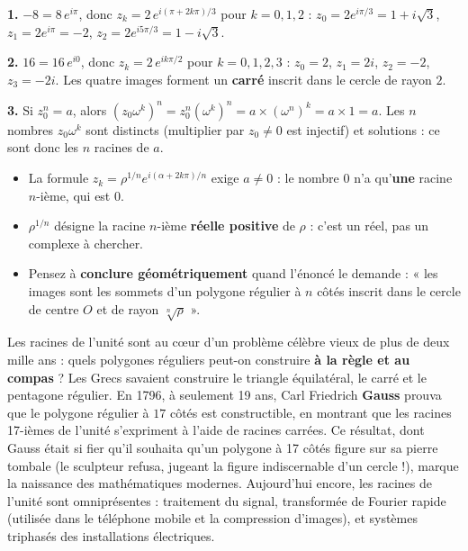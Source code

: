 \documentclass[11pt]{article}
\begin{document}
\begin{corrige}[Exercice]
\textbf{1.} $-8 = 8\,e^{i\pi}$, donc $z_k = 2\,e^{i(\pi + 2k\pi)/3}$ pour $k = 0, 1, 2$ : $z_0 = 2e^{i\pi/3} = 1 + i\sqrt{3}$, $z_1 = 2e^{i\pi} = -2$, $z_2 = 2e^{i5\pi/3} = 1 - i\sqrt{3}$.

\textbf{2.} $16 = 16\,e^{i0}$, donc $z_k = 2\,e^{ik\pi/2}$ pour $k = 0, 1, 2, 3$ : $z_0 = 2$, $z_1 = 2i$, $z_2 = -2$, $z_3 = -2i$. Les quatre images forment un \textbf{carré} inscrit dans le cercle de rayon $2$.

\textbf{3.} Si $z_0^n = a$, alors $(z_0 \omega^k)^n = z_0^n (\omega^k)^n = a \times (\omega^n)^k = a \times 1 = a$. Les $n$ nombres $z_0\omega^k$ sont distincts (multiplier par $z_0 \neq 0$ est injectif) et solutions : ce sont donc les $n$ racines de $a$.
\end{corrige}

\begin{attention}
\begin{itemize}
\item La formule $z_k = \rho^{1/n} e^{i(\alpha + 2k\pi)/n}$ exige $a \neq 0$ : le nombre $0$ n'a qu'\textbf{une} racine $n$-ième, qui est $0$.
\item $\rho^{1/n}$ désigne la racine $n$-ième \textbf{réelle positive} de $\rho$ : c'est un réel, pas un complexe à chercher.
\item Pensez à \textbf{conclure géométriquement} quand l'énoncé le demande : « les images sont les sommets d'un polygone régulier à $n$ côtés inscrit dans le cercle de centre $O$ et de rayon $\sqrt[n]{\rho}$ ».
\end{itemize}
\end{attention}

\begin{savaistu}
Les racines de l'unité sont au cœur d'un problème célèbre vieux de plus de deux mille ans : quels polygones réguliers peut-on construire \textbf{à la règle et au compas} ? Les Grecs savaient construire le triangle équilatéral, le carré et le pentagone régulier. En 1796, à seulement 19 ans, Carl Friedrich \textbf{Gauss} prouva que le polygone régulier à $17$ côtés est constructible, en montrant que les racines 17-ièmes de l'unité s'expriment à l'aide de racines carrées. Ce résultat, dont Gauss était si fier qu'il souhaita qu'un polygone à 17 côtés figure sur sa pierre tombale (le sculpteur refusa, jugeant la figure indiscernable d'un cercle !), marque la naissance des mathématiques modernes. Aujourd'hui encore, les racines de l'unité sont omniprésentes : traitement du signal, transformée de Fourier rapide (utilisée dans le téléphone mobile et la compression d'images), et systèmes triphasés des installations électriques.
\end{savaistu}
\end{document}
